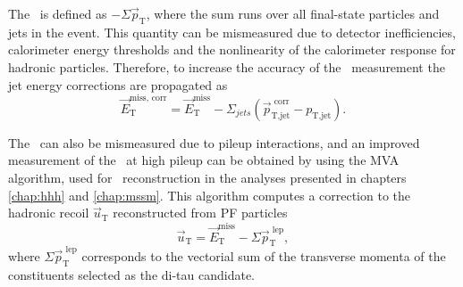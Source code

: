The \MET~is defined as $-\Sigma \vec{p}_{\text{T}}$, where
the sum runs over all final-state particles and jets in the event. This quantity
can be mismeasured due to detector inefficiencies, calorimeter energy thresholds and
the nonlinearity of the calorimeter
response for hadronic particles.
Therefore, to increase the accuracy of the \MET~measurement the jet energy corrections are propagated as
\begin{equation}\label{eqn:objects_met_corr}
\vec{E}_{\text{T}}^{\text{miss, corr}} = \vec{E}_{\text{T}}^{\text{miss}} - \Sigma_{jets} (\vec{p}_{\text{T,jet}}^{\text{  corr}} - p_{\text{T,jet}}).
\end{equation}

The \MET~can also be mismeasured due to pileup interactions, and an improved
measurement of the \MET~at high pileup can be obtained by using the MVA \MET~
algorithm, used for \MET~reconstruction in the analyses presented in chapters \ref{chap:hhh} and 
\ref{chap:mssm}. This algorithm computes a correction to the hadronic
recoil $\vec{u}_{\text{T}}$ reconstructed from \ac{PF} particles
\begin{equation}\label{eqn:objects_met_recoil}
\vec{u}_{\text{T}} = \vec{E}_{\text{T}}^{\text{miss}} - \Sigma \vec{p}_{\text{T}}^{\text{  lep}},
\end{equation}
where $\Sigma \vec{p}_{\text{T}}^{\text{  lep}}$ corresponds to the vectorial sum of the transverse momenta of the
constituents selected as the di-tau candidate.

